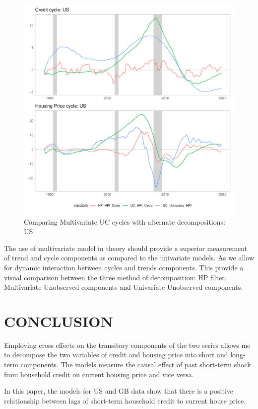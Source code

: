 \documentclass[12pt]{article}
\begin{document}
\begin{outline}[enumerate]
		\begin{figure}[h!]
			\caption{Comparing Multivariate UC cycles with alternate decompositions: US}	
			\centerline{\includegraphics[scale=0.7]{../../Regression/AR_2/Output/graphs/HP_Credit_2graphs_US.pdf}}
		\end{figure}
	
		The use of multivariate model in theory should provide a superior measurement of trend and cycle components as compared to the univariate models. As we allow for dynamic interaction between cycles and trends components. This provide a visual comparison between the three method of decomposition: HP filter, Multivariate Unobserved components and Univariate Unobserved components.
	
		\pagebreak
		\section{CONCLUSION}
		Employing cross effects on the transitory components of the two series allows me to decompose the two variables of credit and housing price into short and long-term components. The models measure the causal effect of past short-term shock from household credit on current housing price and vice versa.
		
		In this paper, the models for US and GB data show that there is a positive relationship between lags of short-term household credit to current house price. 
		

\end{outline}
\end{document}
